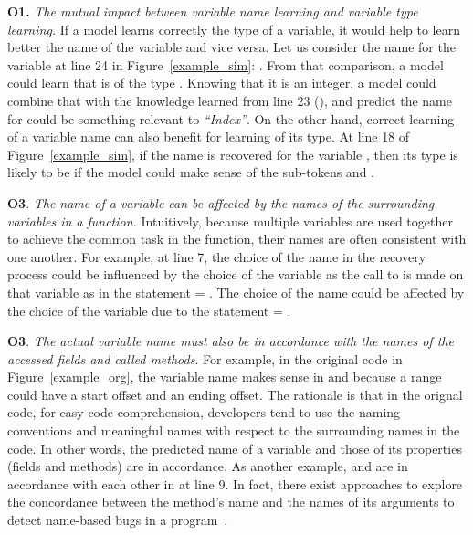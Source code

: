 \textbf{O1.} {\em The mutual impact between variable name learning and
  variable type learning.} If a model learns correctly the type of a
variable, it would help to learn better the name of the variable and
vice versa. Let us consider the name
 for the variable  at line 24 in
Figure~\ref{example_sim}: . From that comparison, a
model could learn that  is of the type . Knowing
that it is an integer, a model could combine that with the knowledge
learned from line 23 (), and predict the
name for  could be something relevant to {\em ``Index''}. On
the other hand, correct learning of a variable name can also benefit
for learning of its type. At line 18 of Figure~\ref{example_sim}, if
the name  is recovered for the variable
, then its type is likely to be  if the model could
make sense of the sub-tokens  and .

\textbf{O3}. {\em The name of a variable can be affected by the names
  of the surrounding variables in a function.} Intuitively, because
multiple variables are used together to achieve the common task in the
function, their names are often consistent with one another. For
example, at line 7, the choice of the name  in the
recovery process could be influenced by the choice of the variable
 as the call to  is made on that
variable as in the statement  =
. The choice of the name
 could be affected by the choice of the
variable  due to the statement  =
.

\textbf{O3}. {\em The actual variable name must also be in accordance
  with the names of the accessed fields and called methods}. For
example, in the original code in Figure~\ref{example_org}, the
variable name  makes sense in  and
 because a range could have a start offset and
an ending offset. The rationale is that in the orignal code, for easy
code comprehension, developers tend to use the naming conventions and
meaningful names with respect to the surrounding names in the code. In
other words, the predicted name of a variable and those of its
properties (fields and methods) are in accordance. As another example,
 and  are in accordance with each
other in  at line 9. In fact, there exist
approaches to explore the concordance between the method's name and
the names of its arguments to detect name-based bugs in a
program~\cite{deepbugs-oopsla18}.


